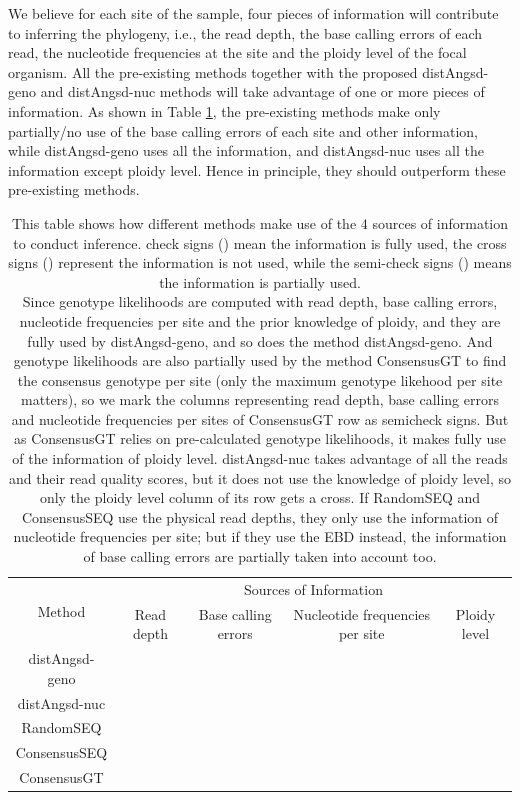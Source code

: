 \documentclass{article}
\newcommand{\tickYes}{\checkmark}
\newcommand{\tickNo}{\hspace{1pt}\ding{55}}
\newcommand{\tickHalfYes}{\checkmark\!\!\!\raisebox{0.4 em}{\tiny$\smallsetminus$}}
\begin{document}
We believe for each site of the sample, four pieces of information will contribute to inferring the phylogeny, i.e., the read depth, the base calling errors of each read, the nucleotide frequencies at the site and the ploidy level of the focal organism. All the pre-existing methods together with the proposed distAngsd-geno and distAngsd-nuc methods will take advantage of one or more pieces of information. As shown in Table \ref{tab:Information}, the pre-existing methods make only partially/no use of the base calling errors of each site and other information, while distAngsd-geno uses all the information, and distAngsd-nuc uses all the information except ploidy level. Hence in principle, they should outperform these pre-existing methods.
\begin{table}[h]
    \centering
    \begin{tabular}{|c|cccc|}
     \hline
      \multirow{2}{*}{Method} & \multicolumn{4}{c|}{Sources of Information}\\
         &Read depth & Base calling errors & Nucleotide frequencies per site & Ploidy level\\
      \hline
      distAngsd-geno & \tickYes & \tickYes & \tickYes & \tickYes\\
      distAngsd-nuc & \tickYes & \tickYes & \tickYes & \tickNo\\
      RandomSEQ & \tickNo & \tickHalfYes & \tickYes & \tickNo\\
      ConsensusSEQ & \tickNo & \tickHalfYes & \tickYes & \tickNo\\
      ConsensusGT & \tickHalfYes & \tickHalfYes & \tickHalfYes & \tickYes\\
      \hline
      \end{tabular}
    \caption{This table shows how different methods make use of the $4$ sources of information to conduct inference. check signs (\tickYes) mean the information is fully used, the cross signs (\tickNo) represent the information is not used, while the semi-check signs (\tickHalfYes) means the information is partially used. \\Since genotype likelihoods are computed with read depth, base calling errors, nucleotide frequencies per site and the prior knowledge of ploidy, and they are fully used by distAngsd-geno, and so does the method distAngsd-geno. And genotype likelihoods are also partially used by the method ConsensusGT to find the consensus genotype per site (only the maximum genotype likehood per site matters), so we mark the columns representing read depth, base calling errors and nucleotide frequencies per sites of ConsensusGT row as semicheck signs. But as ConsensusGT relies on pre-calculated genotype likelihoods, it makes fully use of the information of ploidy level. distAngsd-nuc takes advantage of all the reads and their read quality scores, but it does not use the knowledge of ploidy level, so only the ploidy level column of its row gets a cross. If RandomSEQ and ConsensusSEQ use the physical read depths, they only use the information of nucleotide frequencies per site; but if they use the EBD instead, the information of base calling errors are partially taken into account too.}
    \label{tab:Information}
\end{table}
\end{document}
